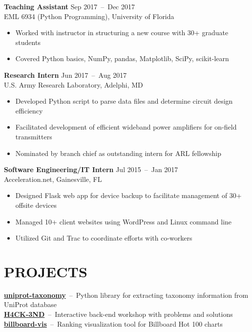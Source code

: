 \documentclass[line,resmargin]{res}
\begin{document}
\begin{resume}
    \textbf{Teaching Assistant}    \hfill Sep 2017~--~Dec 2017 \\
    EML 6934 (Python Programming), University of Florida
    \begin{itemize}  \itemsep -2pt
        \item Worked with instructor in structuring a new course with 30+ graduate students
        \item Covered Python basics, NumPy, pandas, Matplotlib, SciPy, scikit-learn
    \end{itemize}

    \textbf{Research Intern}    \hfill Jun 2017~--~Aug 2017 \\
    U.S. Army Research Laboratory, Adelphi, MD
    \begin{itemize}  \itemsep -2pt
        \item Developed Python script to parse data files and determine circuit design efficiency
        \item Facilitated development of efficient wideband power amplifiers for on-field transmitters
        \item Nominated by branch chief as outstanding intern for ARL fellowship
    \end{itemize}

    \textbf{Software Engineering/IT Intern}    \hfill Jul 2015~--~Jan 2017 \\
    Acceleration.net, Gainesville, FL
    \begin{itemize}  \itemsep -2pt
        \item Designed Flask web app for device backup to facilitate management of 30+ offsite devices
        \item Managed 10+ client websites using WordPress and Linux command line
        \item Utilized Git and Trac to coordinate efforts with co-workers
    \end{itemize}

\section{PROJECTS}
    \textbf{\href{https://github.com/zhoulab/uniprot-taxonomy}{uniprot-taxonomy}}~--~Python library for extracting taxonomy information from UniProt database \\
    \textbf{\href{https://victorl.in/hack-end}{H4CK-3ND}}~--~Interactive back-end workshop with problems and solutions \\
    \textbf{\href{https://victorl.in/billboard-vis}{billboard-vis}}~--~Ranking visualization tool for Billboard Hot 100 charts \\


\end{resume}
\end{document}
